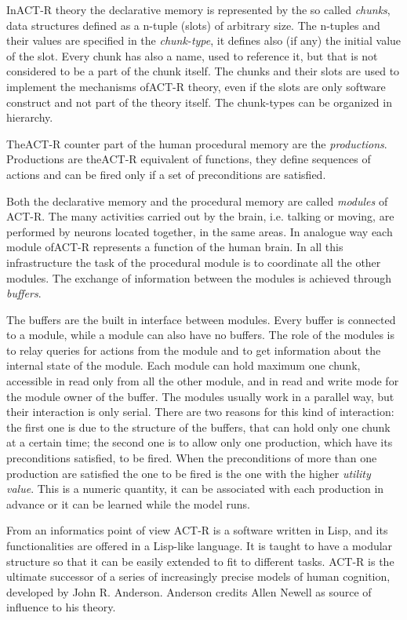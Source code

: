 	In\mbox{ACT-R} theory the declarative memory is represented by the so called \emph{chunks}, data structures defined as a n-tuple (slots) of arbitrary size. The n-tuples and their values are specified in the \emph{chunk-type}, it defines also (if any) the initial value of the slot. Every chunk has also a name, used to reference it, but that is not considered to be a part of the chunk itself. The chunks and their slots are used to implement the mechanisms of\mbox{ACT-R} theory, even if the slots are only software construct and not part of the theory itself. The chunk-types can be organized in hierarchy.

	The\mbox{ACT-R} counter part of the human procedural memory are the \emph{productions}. Productions are the\mbox{ACT-R} equivalent of functions, they define sequences of actions and can be fired only if a set of preconditions are satisfied. 

	Both the declarative memory and the procedural memory are called \emph{modules} of \mbox{ACT-R}.  The many activities carried out by the brain, i.e. talking or moving, are performed by neurons located together, in the same areas. In analogue way each module of\mbox{ACT-R} represents a function of the human brain. In all this infrastructure the task of the procedural module is to coordinate all the other modules. The exchange of information between the modules is achieved through \emph{buffers}.

	The buffers are the built in interface between modules. Every buffer is connected to a module, while a module can also have no buffers. The role of the modules is to relay queries for actions from the module and to get information about the internal state of the module. Each module can hold maximum one chunk, accessible in read only from all the other module, and in read and write mode for the module owner of the buffer. The modules usually work in a parallel way, but their interaction is only serial. There are two reasons for this kind of interaction: the first one is due to the structure of the buffers, that can hold only one chunk at a certain time; the second one is to allow only one production, which have its preconditions satisfied, to be fired. When the preconditions of more than one production are satisfied the one to be fired is the one with the higher \emph{utility value}. This is a numeric quantity, it can be associated with each production in advance or it can be learned while the model runs.

	From an informatics point of view ACT-R is a software written in Lisp, and its functionalities are offered in a Lisp-like language. It is taught to have a modular structure so that it can be easily extended to fit to different tasks. ACT-R is the ultimate successor of a series of increasingly precise models of human cognition, developed by John R. Anderson. Anderson credits Allen Newell as source of influence to his theory.




